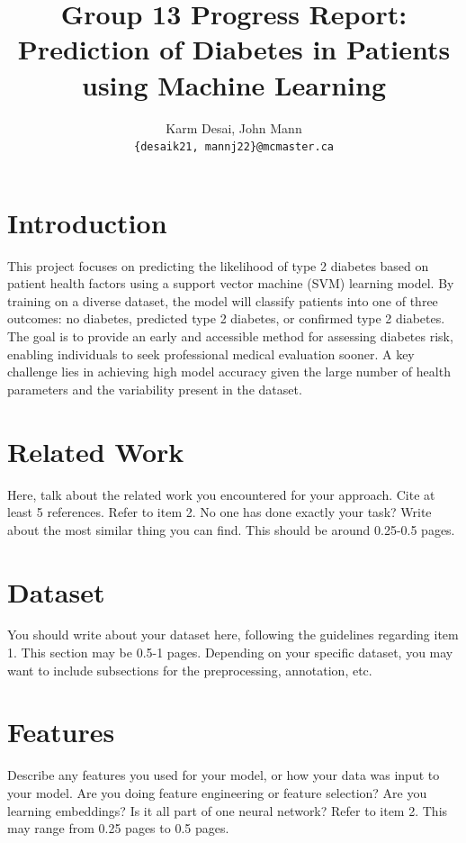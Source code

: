 \documentclass[11pt]{article}
\title{Group 13 Progress Report:\\Prediction of Diabetes in Patients using Machine Learning}
\author{Karm Desai, John Mann \\
  \texttt{\{desaik21, mannj22\}@mcmaster.ca} }
\begin{document}
\maketitle

\section{Introduction}

This project focuses on predicting the likelihood of type 2 diabetes based on patient health factors using a support vector machine (SVM) learning model. By training on a diverse dataset, the model will classify patients into one of three outcomes: no diabetes, predicted type 2 diabetes, or confirmed type 2 diabetes. The goal is to provide an early and accessible method for assessing diabetes risk, enabling individuals to seek professional medical evaluation sooner. A key challenge lies in achieving high model accuracy given the large number of health parameters and the variability present in the dataset.

\section{Related Work}

Here, talk about the related work you encountered for your approach. Cite at least 5 references. Refer to item 2. No one has done exactly your task? Write about the most similar thing you can find. This should be around 0.25-0.5 pages.

\section{Dataset}

You should write about your dataset here, following the guidelines regarding item 1. This section may be 0.5-1 pages. Depending on your specific dataset, you may want to include subsections for the preprocessing, annotation, etc.

\section{Features}

Describe any features you used for your model, or how your data was input to your model. Are you doing feature engineering or feature selection? Are you learning embeddings? Is it all part of one neural network? Refer to item 2. This may range from 0.25 pages to 0.5 pages.
\end{document}
